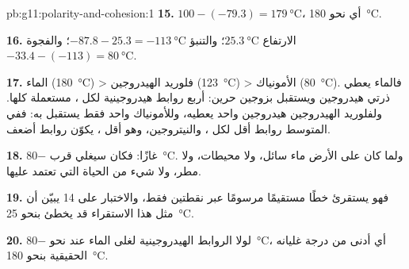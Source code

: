 \begin{solution}{pb:g11:polarity-and-cohesion:1}
\textbf{15.} $100 - (-79.3) = \qty{179}{\celsius}$، أي نحو
\qty{180}{\celsius}.

\textbf{16.} الارتفاع $\qty{25.3}{\celsius}$؛ والتنبؤ $-87.8 - 25.3 =
\qty{-113}{\celsius}$؛ والفجوة $-33.4 - (-113) = \qty{80}{\celsius}$.

\textbf{17.} الماء (\qty{180}{\celsius}) > فلوريد الهيدروجين
(\qty{123}{\celsius}) > الأمونياك (\qty{80}{\celsius}). فالماء يعطي ذرتي
هيدروجين ويستقبل بزوجين حرين: أربع روابط هيدروجينية لكل
، مستعملة كلها. ولفلوريد الهيدروجين هيدروجين واحد يعطيه، وللأمونياك
 واحد فقط يستقبل به: ففي المتوسط روابط أقل لكل
، والنيتروجين، وهو أقل ، يكوّن روابط أضعف.

\textbf{18.} غازًا: فكان سيغلي قرب \qty{-80}{\celsius}. ولما كان على الأرض
ماء سائل، ولا محيطات، ولا مطر، ولا شيء من الحياة
التي تعتمد عليها.

\textbf{19.} فهو يستقرئ خطًا مستقيمًا مرسومًا عبر نقطتين
فقط، والاختبار على  14 يبيّن أن مثل هذا الاستقراء قد يخطئ
بنحو \qty{25}{\celsius}.

\textbf{20.} لولا الروابط الهيدروجينية لغلى الماء عند نحو
\qty{-80}{\celsius}، أي أدنى من درجة غليانه الحقيقية بنحو
\qty{180}{\celsius}.
\end{solution}
